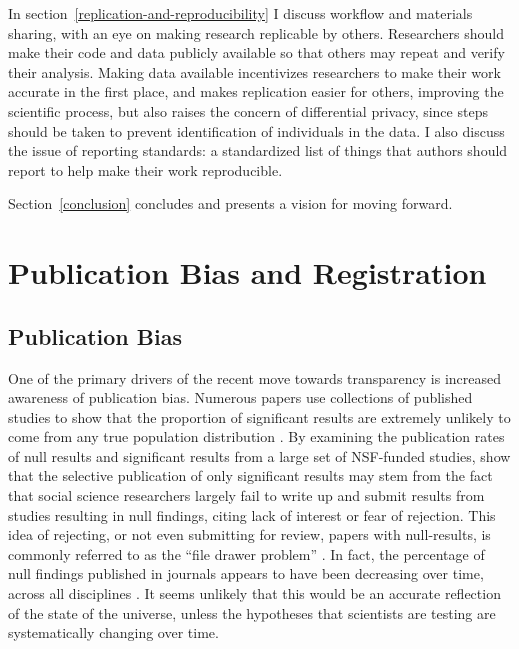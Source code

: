 \documentclass[12pt] {article}
\begin{document}
In section~\ref{replication-and-reproducibility} I discuss workflow and materials sharing, with an eye on
making research replicable by others. Researchers should make their code
and data publicly available so that others may repeat and verify their
analysis. Making data available incentivizes researchers to make their
work accurate in the first place, and makes replication easier for
others, improving the scientific process, but also raises the concern of
differential privacy, since steps should be taken to prevent
identification of individuals in the data. I also discuss the issue of
reporting standards: a standardized list of things that authors should
report to help make their work reproducible.

Section~\ref{conclusion} concludes and presents a vision for moving forward.




\section{Publication Bias and Registration}\label{registration}

\subsection{Publication Bias}\label{publication-bias}

One of the primary drivers of the recent move towards transparency is
increased awareness of publication bias. Numerous papers use collections
of published studies to show that the proportion of significant results
are extremely unlikely to come from any true population distribution
\citep{delong_are_1992, gerber_testing_2001,  ioannidis_why_2005}. By examining the publication rates of null results and
significant results from a large set of NSF-funded studies, \cite{franco_publication_2014} show that the selective publication of only
significant results may stem from the fact that social science
researchers largely fail to write up and submit results from studies
resulting in null findings, citing lack of interest or fear of
rejection. This idea of rejecting, or not even submitting for review, papers with null-results, is commonly referred to as the ``file drawer problem'' \citep{rosenthal1979file}. In fact, the percentage of null findings published in
journals appears to have been decreasing over time, across all
disciplines \citep{fanelli_negative_2012}. It seems unlikely that this would
be an accurate reflection of the state of the universe, unless the hypotheses that scientists are testing are systematically changing over time. 
\end{document}
